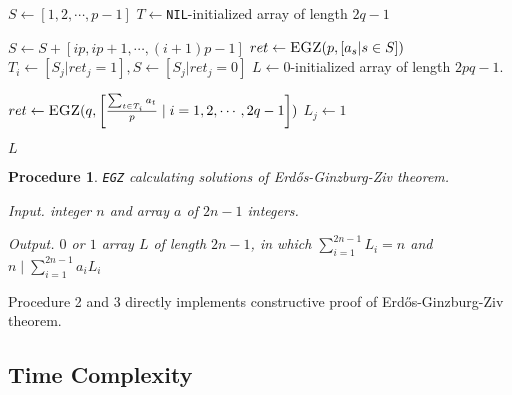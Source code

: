 \documentclass[11pt]{article}
\newtheorem{procedure}{Procedure}
\newcommand{\EGZT}{Erd\H{o}s-Ginzburg-Ziv theorem}
\begin{document}
\begin{algorithmic}[1]


    \State $S \gets [1, 2, \cdots, p-1]$
    \State $T \gets $\texttt{NIL}-initialized array of length $2q-1$
    
        \State $S \gets S + [ip, ip+1, \cdots, (i+1)p-1]$
        \State $ret \gets \Call{EGZ}{p, [a_s | s \in S]}$
        \State $T_i \gets [S_j | ret_j = 1], S \gets [S_j | ret_j = 0]$
    \EndFor
    \State $L \gets 0$-initialized array of length $2pq-1$.

    \State $ret \gets \Call{EGZ}{q, \left[\frac{\sum_{t \in T_i} a_t }{p} \mid i = 1, 2, \cdots, 2q-1\right]}$
            \State $L_j \gets 1$
        \EndFor
    \EndFor
    
    \State \Return $L$
\EndFunction


\end{algorithmic}

\begin{procedure} \texttt{EGZ} calculating solutions of \EGZT.

Input. integer $n$ and array $a$ of $2n-1$ integers.

Output. $0$ or $1$ array $L$ of length $2n-1$, in which $\sum_{i=1}^{2n-1} {L}_{i} = n$ and $n \mid \sum_{i=1}^{2n-1} {a}_{i}{L}_{i}$


\end{procedure}

\begin{algorithmic}[1]

        \State \Return [1]
    \EndIf
    
            \State \Return {}
        \EndIf
    \EndFor
    
    \State \Return {}
\EndFunction


Procedure 2 and 3 directly implements constructive proof of \EGZT.


\end{algorithmic}

\subsection{Time Complexity}
\end{document}
